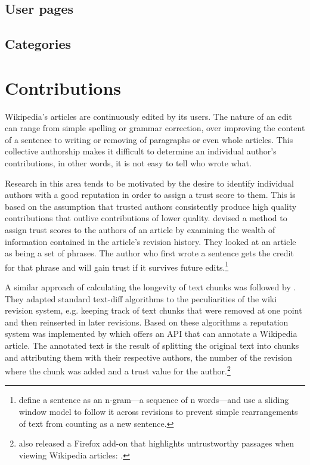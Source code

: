 \subsection{User pages}\label{sub:userpages}


\subsection{Categories}\label{sub:categories}



\section{Contributions}\label{sec:contribution}

Wikipedia's articles are continuously edited by its users.
The nature of an edit can range from simple spelling or grammar correction, over improving the content of a sentence to writing or removing of paragraphs or even whole articles. 
This collective authorship makes it difficult to determine an individual author's contributions, in other words, it is not easy to tell who wrote what.

Research in this area tends to be motivated by the desire to identify individual authors with a good reputation in order to assign a trust score to them.
This is based on the assumption that trusted authors consistently produce high quality contributions that outlive contributions of lower quality.
\textcite{kramer2008wiki} devised a method to assign trust scores to the authors of an article by examining the wealth of information contained in the article's revision history.
They looked at an article as being a set of phrases.
The author who first wrote a sentence gets the credit for that phrase and will gain trust if it survives future edits.\footnote{\textcite{kramer2008wiki} define a sentence as an n-gram---a sequence of n words---and use a sliding window model to follow it across revisions to prevent simple rearrangements of text from counting as a new sentence.}

A similar approach of calculating the longevity of text chunks was followed by \textcite{adler2007content}.
They adapted standard text-diff algorithms to the peculiarities of the wiki revision system, e.g. keeping track of text chunks that were removed at one point and then reinserted in later revisions.
Based on these algorithms a reputation system was implemented by \textcite{adler2008assigning} which offers an API that can annotate a Wikipedia article.
The annotated text is the result of splitting the original text into chunks and attributing them with their respective authors, the number of the revision where the chunk was added and a trust value for the author.\footnote{\citeauthor{adler2008assigning} also released a Firefox add-on that highlights untrustworthy passages when viewing Wikipedia articles: .}



